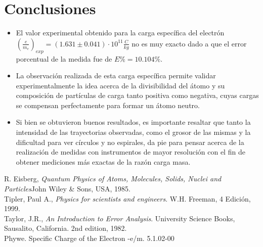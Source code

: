\documentclass[prb,aps,twocolumn,preprintnumbers,amsmath,amssymb]{revtex4}
\begin{document}
\section{Conclusiones}

\begin{itemize}
	
	\item El valor experimental obtenido para la carga específica del electrón $\left( \frac{e}{m_{e}} \right)_{exp} = (1.631 \pm 0.041) \cdot 10^{11} \frac{C}{kg}$ no es muy exacto dado a que el error porcentual de la medida fue de $E\% = 10.104\%$.
		
	\item La observación realizada de esta carga específica permite validar experimentalmente la idea acerca de la divisibilidad del átomo y su composición de partículas de carga tanto positiva como negativa, cuyas cargas se compensan perfectamente para formar un átomo neutro.
	
	\item Si bien se obtuvieron buenos resultados, es importante resaltar que tanto la intensidad de las trayectorias observadas, como el grosor de las mismas y la dificultad para ver círculos y no espirales, da pie para pensar acerca de la realización de medidas con instrumentos de mayor resolución con el fin de obtener mediciones más exactas de la razón carga masa.
	
\end{itemize}

\begin{thebibliography}{99}
 R. Eisberg, {\it Quantum Physics of Atoms, Molecules, Solids, Nuclei and Particles}{John Wiley \& Sons, USA, 1985}.\\

 Tipler, Paul A., \textit{Physics for scientists and engineers}. W.H. Freeman, 4 Edici\' on, 1999.\\
 Taylor, J.R., \textit{An Introduction to Error Analysis}. University Science Books, Sausalito, California. 2nd edition, 1982.\\
 Phywe. Specific Charge of the Electron -e/m. 5.1.02-00\\
\end{thebibliography}
\end{document}
